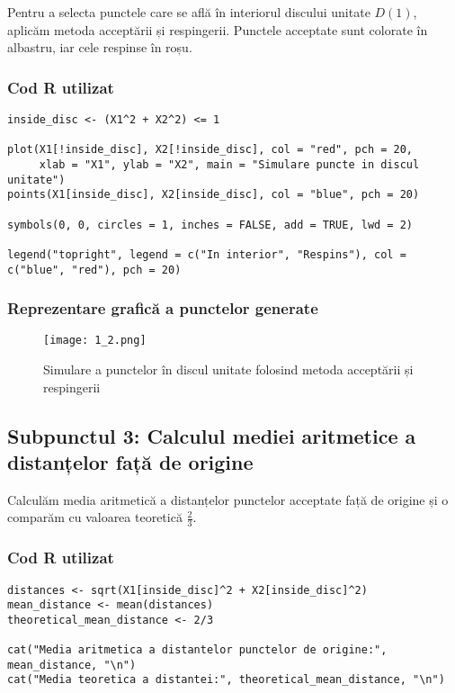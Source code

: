 \documentclass{article}
\begin{document}
Pentru a selecta punctele care se află în interiorul discului unitate \( D(1) \), aplicăm metoda acceptării și respingerii.  
Punctele acceptate sunt colorate în albastru, iar cele respinse în roșu.

\subsubsection*{Cod R utilizat}
\begin{lstlisting}
inside_disc <- (X1^2 + X2^2) <= 1

plot(X1[!inside_disc], X2[!inside_disc], col = "red", pch = 20, 
     xlab = "X1", ylab = "X2", main = "Simulare puncte in discul unitate")
points(X1[inside_disc], X2[inside_disc], col = "blue", pch = 20)  

symbols(0, 0, circles = 1, inches = FALSE, add = TRUE, lwd = 2)

legend("topright", legend = c("In interior", "Respins"), col = c("blue", "red"), pch = 20)
\end{lstlisting}

\newpage

\subsubsection*{Reprezentare grafică a punctelor generate}

\begin{figure}[h]
    \centering
    \texttt{[image: 1\_2.png]}
    \caption{Simulare a punctelor în discul unitate folosind metoda acceptării și respingerii}
    \label{fig:disc_acceptare}
\end{figure}

\newpage

\subsection{Subpunctul 3: Calculul mediei aritmetice a distanțelor față de origine}

Calculăm media aritmetică a distanțelor punctelor acceptate față de origine și o comparăm cu valoarea teoretică \( \frac{2}{3} \).

\subsubsection*{Cod R utilizat}
\begin{lstlisting}
distances <- sqrt(X1[inside_disc]^2 + X2[inside_disc]^2)
mean_distance <- mean(distances)
theoretical_mean_distance <- 2/3

cat("Media aritmetica a distantelor punctelor de origine:", mean_distance, "\n")
cat("Media teoretica a distantei:", theoretical_mean_distance, "\n")
\end{lstlisting}
\end{document}

